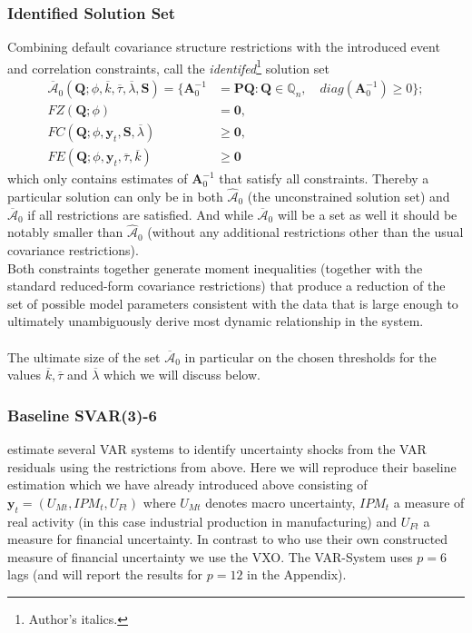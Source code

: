 \documentclass[a4paper,11pt,listof=nochaptergap,oneside,pointednumbers,bibtotoc,bigheadings,liststotoc]{scrbook}
\theoremstyle{mysatz}
\theoremstyle{mydefinition}
\theoremstyle{mybemerkung}
\renewcommand*{\paragraph}[1]{\subsubsection*{#1} \vspace{-3mm}} %
\let\oldhat\hat
\newcommand{\vect}[1]{\boldsymbol{\mathbf{#1}}}
\newcommand{\hatt}[1]{\oldhat{\boldsymbol{\mathbf{#1}}}}
\begin{document}
\paragraph{Identified Solution Set}
Combining default covariance structure restrictions with the introduced event and correlation constraints, \citet{ludvigsonetal:18} call the \textit{identifed}\footnote{Author's italics.} solution set 
\begin{equation} \label{eq:svar_ludvi14}
\begin{split}
\overline{\vect{\mathcal{A}}}_0(\vect{Q}; \phi, \overline{k}, \overline{\tau}, \overline{\lambda}, \vect{S})  = \{\vect{A}_0^{-1} & = \vect{P}\vect{Q}: \vect{Q} \in \mathbb{Q}_n, \quad diag(\vect{A}_0^{-1}) \geq 0\}; \\
			FZ(\vect{Q}; \phi) & = \vect{0}, \\
			FC(\vect{Q}; \phi, \vect{y}_t, \vect{S}, \overline{\lambda}) & \geq \vect{0}, \\
			FE(\vect{Q}; \phi, \vect{y}_t, \overline{\tau}, \overline{k}) & \geq \vect{0}
\end{split}								
\end{equation}
which only contains estimates of $\vect{A}_0^{-1}$ that satisfy all constraints. Thereby a particular solution can only be in both $\hatt{\mathcal{A}}_0$ (the unconstrained solution set) and $\overline{\vect{\mathcal{A}}}_0$ if all restrictions are satisfied. And while $\overline{\vect{\mathcal{A}}}_0$ will be a set as well it should be notably smaller than $\hatt{\mathcal{A}}_0$ (without any additional restrictions other than the usual covariance restrictions).
\\
Both constraints together generate moment inequalities (together with the standard reduced-form covariance restrictions) that produce a reduction of the set of possible model parameters consistent with the data that is large enough to ultimately unambiguously derive most dynamic relationship in the system.\\
\\
The ultimate size of the set $\overline{\vect{\mathcal{A}}}_0$ in particular on the chosen thresholds for the values $\overline{k}, \overline{\tau}$ and $\overline{\lambda}$ which we will discuss below.

\paragraph{Baseline SVAR(3)-6}
\citet{ludvigsonetal:18} estimate several VAR systems to identify uncertainty shocks from the VAR residuals using the restrictions from above. Here we will reproduce their baseline estimation which we have already introduced above consisting of $\vect{y}_t = (U_{Mt}, IPM_{t}, U_{Ft})$ where $U_{Mt}$ denotes macro uncertainty, $IPM_{t}$ a measure of real activity (in this case industrial production in manufacturing) and $U_{Ft}$ a measure for financial uncertainty. In contrast to \citet{ludvigsonetal:18} who use their own constructed measure of financial uncertainty we use the VXO. The VAR-System uses $p=6$ lags (and will report the results for $p=12$ in the Appendix).
\end{document}
